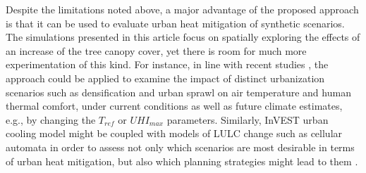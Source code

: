 \documentclass[10pt,letterpaper]{article}
\begin{document}



Despite the limitations noted above, a major advantage of the proposed approach is that it can be used to evaluate urban heat mitigation of synthetic scenarios.
The simulations presented in this article focus on spatially exploring the effects of an increase of the tree canopy cover, yet there is room for much more experimentation of this kind.
For instance, in line with recent studies \cite{lemonsu2015vulnerability,yang2016contrasting,trimmel2019thermal}, the approach could be applied to examine the impact of distinct urbanization scenarios such as densification and urban sprawl on air temperature and human thermal comfort, under current conditions as well as future climate estimates, e.g., by changing the $T_{ref}$ or $UHI_{max}$ parameters.
Similarly, InVEST urban cooling model might be coupled with models of LULC change such as cellular automata in order to assess not only which scenarios are most desirable in terms of urban heat mitigation, but also which planning strategies might lead to them \cite{silva2008strategies,white2015modeling,bosch2019addressing}.
\end{document}
